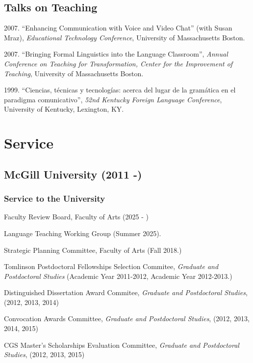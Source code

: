 \documentclass[11pt]{article}
\begin{document}
\subsection*{Talks on Teaching}


2007. ``Enhancing Communication with Voice and Video Chat'' (with Susan Mraz), \textit{Educational Technology Conference}, University of Massachusetts Boston.

2007. ``Bringing Formal Linguistics into the Language Classroom'', \textit{Annual Conference on Teaching for Transformation, Center for the Improvement of Teaching}, University of Massachusetts Boston.

1999. ``Ciencias, t\'ecnicas y tecnolog\'ias: acerca del lugar de la gram\'atica en el paradigma comunicativo'', \textit{52nd Kentucky Foreign Language Conference}, University of Kentucky, Lexington, KY.

\section*{Service}

\subsection*{McGill University (2011 -)}

\subsubsection*{Service to the University}

Faculty Review Board, Faculty of Arts (2025 - )

Language Teaching Working Group (Summer 2025).

Strategic Planning Committee, Faculty of Arts (Fall 2018.)

Tomlinson Postdoctoral Fellowships Selection Commitee, \textit{Graduate and
  Postdoctoral Studies} (Academic Year 2011-2012, Academic Year 2012-2013.)

Distinguished Dissertation Award Commitee, \textit{Graduate and
  Postdoctoral Studies}, (2012, 2013, 2014)

Convocation Awards Committee, \textit{Graduate and
  Postdoctoral Studies}, (2012, 2013, 2014, 2015)

CGS Master's Scholarships Evaluation Committee, \textit{Graduate and
  Postdoctoral Studies}, (2012, 2013, 2015)
\end{document}
